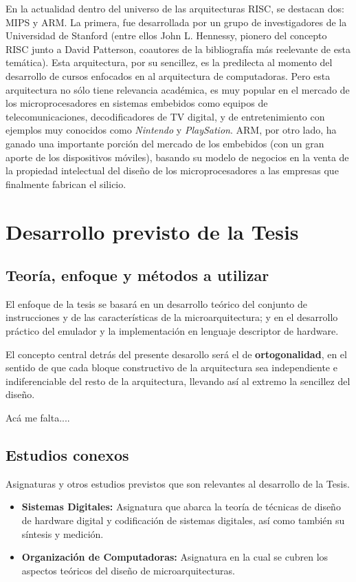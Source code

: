 \documentclass[a4paper]{article}
\begin{document}
En la actualidad dentro del universo de las arquitecturas RISC, se destacan dos: MIPS y ARM. La primera, fue desarrollada por un grupo de investigadores de la Universidad de Stanford (entre ellos John L. Hennessy, pionero del concepto RISC junto a David Patterson, coautores de la bibliografía más reelevante de esta temática). Esta arquitectura, por su sencillez, es la predilecta al momento del desarrollo de cursos enfocados en al arquitectura de computadoras. Pero esta arquitectura no sólo tiene relevancia académica, es muy popular en el mercado de los microprocesadores en sistemas embebidos como equipos de telecomunicaciones, decodificadores de TV digital, y de entretenimiento con ejemplos muy conocidos como \emph{Nintendo} y \emph{PlaySation}. ARM, por otro lado, ha ganado una importante porción del mercado de los embebidos (con un gran aporte de los dispositivos móviles), basando su modelo de negocios en la venta de la propiedad intelectual del diseño de los microprocesadores a las empresas que finalmente fabrican el silicio.

\section{Desarrollo previsto de la Tesis}

\subsection{Teoría, enfoque y métodos a utilizar}

El enfoque de la tesis se basará en un desarrollo teórico del conjunto de instrucciones y de las características de la microarquitectura; y en el desarrollo
práctico del emulador y la implementación en lenguaje descriptor de hardware.

El concepto central detrás del presente desarollo será el de \textbf{ortogonalidad}, en el sentido de que cada bloque constructivo de la arquitectura sea independiente e indiferenciable del resto de la arquitectura, llevando así al extremo la sencillez del diseño.

Acá me falta....

\subsection{Estudios conexos}

Asignaturas y otros estudios previstos que son relevantes al desarrollo de la Tesis.

\begin{itemize}
	\item \textbf{Sistemas Digitales:} Asignatura que abarca la teoría de técnicas de diseño de hardware digital y codificación de sistemas digitales, así como también su síntesis y medición.
	\item \textbf{Organización de Computadoras:} Asignatura en la cual se cubren los aspectos teóricos del diseño de microarquitecturas.
\end{itemize}
\end{document}
